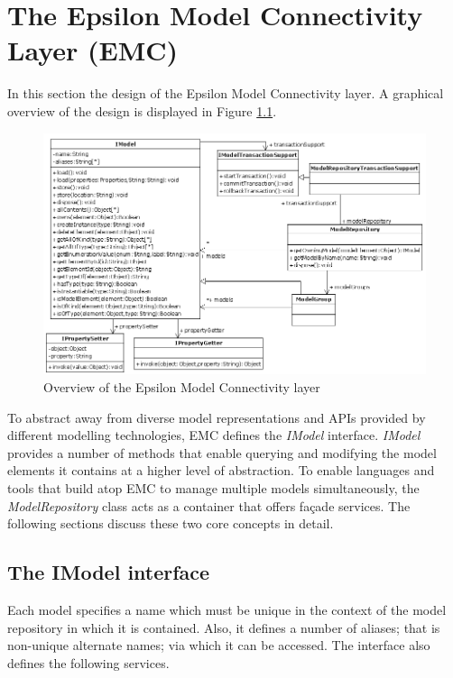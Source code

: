 \chapter{The Epsilon Model Connectivity Layer (EMC)}
\label{sec:Design.EMC}

In this section the design of the Epsilon Model Connectivity layer. A graphical overview of the design is displayed in Figure \ref{fig:EMC}.

\begin{landscape}

\begin{figure}
	\centering
		\includegraphics{images/EMC.png}
	\caption{Overview of the Epsilon Model Connectivity layer}
	\label{fig:EMC}
\end{figure}

\end{landscape}

To abstract away from diverse model representations and APIs provided by different modelling technologies, EMC defines the \emph{IModel} interface. \emph{IModel} provides a number of methods that enable querying and modifying the model elements it contains at a higher level of abstraction. To enable languages and tools that build atop EMC to manage multiple models simultaneously, the \emph{ModelRepository} class acts as a container that offers fa\c{c}ade services. The following sections discuss these two core concepts in detail.

\section{The IModel interface}

Each model specifies a name which must be unique in the context of the model repository in which it is contained. Also, it defines a number of aliases; that is non-unique alternate names; via which it can be accessed. The interface also defines the following services.

